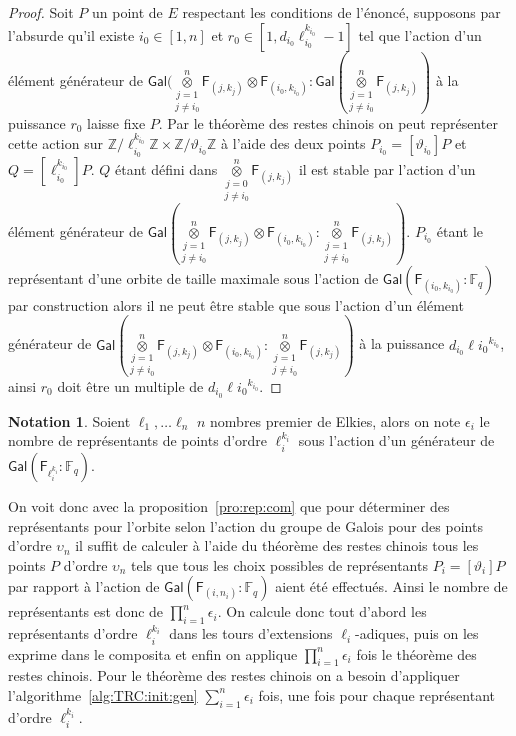 \documentclass[10pt,a4paper]{book}
\theoremstyle{plain}
\theoremstyle{definition}
\theoremstyle{definition}
\theoremstyle{definition}
\theoremstyle{definition}
\theoremstyle{remark}
\theoremstyle{remark}
\theoremstyle{definition}
\newtheorem{nota}[thm]{Notation}
\begin{document}
\begin{proof}
Soit $P$ un point de $E$ respectant les conditions de l'énoncé, supposons par 
l'absurde qu'il existe $i_0 \in [1,n]$ et $r_0 \in [1,d_{i_0}\ell_{i_0}^{k_{i_0}}-1]$ 
tel que l'action d'un élément générateur de 
$\mathsf{Gal}(\overset{n}{\underset{j \neq i_0}{\underset{j = 1}{\otimes}}}\mathsf{F}_{(j,k_j)}\otimes \mathsf{F}_{(i_0,k_{i_0})}:\mathsf{Gal}(\overset{n}{\underset{j \neq i_0}{\underset{j = 1}{\otimes}}}\mathsf{F}_{(j,k_j)})$ 
à la puissance $r_0$ laisse fixe $P$. Par le théorème des restes chinois on 
peut représenter cette action sur $\mathbb{Z}/\ell_{i_0}^{k_{i_0}}\mathbb{Z} 
\times \mathbb{Z}/\vartheta_{i_0}\mathbb{Z}$
à l'aide des deux points $P_{i_0}=[\vartheta_{i_0}]P$  et 
$Q=[\ell_{i_0}^{k_{i_0}}]P$. $Q$ étant défini dans 
$\overset{n}{\underset{j \neq i_0}{\underset{j = 0}{\otimes}}} \mathsf{F}_{(j,k_j)}$ 
il est stable par l'action d'un élément générateur de 
$\mathsf{Gal}(\overset{n}{\underset{j \neq i_0}{\underset{j = 1}{\otimes}}}\mathsf{F}_{(j,k_j)}\otimes \mathsf{F}_{(i_0,k_{i_0})}:\overset{n}{\underset{j \neq i_0}{\underset{j = 1}{\otimes}}}\mathsf{F}_{(j,k_j)})$.
$P_{i_0}$ étant le représentant d'une orbite de taille maximale
sous l'action de $\mathsf{Gal}(\mathsf{F}_{(i_0,k_{i_0})}:\mathbb{F}_q)$ par 
construction alors il ne peut être stable que sous l'action d'un élément 
générateur de 
$\mathsf{Gal}(\overset{n}{\underset{j \neq i_0}{\underset{j = 1}{\otimes}}}\mathsf{F}_{(j,k_j)}\otimes \mathsf{F}_{(i_0,k_{i_0})}:\overset{n}{\underset{j \neq i_0}{\underset{j = 1}{\otimes}}}\mathsf{F}_{(j,k_j)})$
à la puissance $d_{i_0}\ell{i_0}^{k_{i_0}}$, ainsi $r_0$ doit être un multiple 
de $d_{i_0}\ell{i_0}^{k_{i_0}}$.
\end{proof}

\begin{nota}
Soient $\ell_1, \dots \ell_n$ $n$ nombres premier de Elkies, alors on note 
$\epsilon_i$ le nombre de représentants de points d'ordre $\ell_i^{k_i}$ sous 
l'action d'un générateur de $\mathsf{Gal}(\mathsf{F}_{\ell_i^{k_i}}:\mathbb{F}_q)$.
\end{nota}

On voit donc avec la proposition~\ref{pro:rep:com} que pour déterminer des 
représentants pour l'orbite selon l'action du groupe de Galois pour des points 
d'ordre $\upsilon_n$ il suffit de calculer à l'aide du théorème des 
restes chinois tous les points $P$ d'ordre $\upsilon_n$ 
tels que tous les choix possibles de représentants $P_i=[\vartheta_i]P$
par rapport à l'action de $\mathsf{Gal}(\mathsf{F}_{(i,n_i)}:\mathbb{F}_q)$
 aient été effectués. Ainsi le nombre de représentants est
 donc de $\prod_{i=1}^{n} \epsilon_i$. On calcule donc 
 tout d'abord les représentants d'ordre $\ell_i^{k_i}$ dans les tours 
 d'extensions $\ell_i$-adiques, puis on les exprime dans le composita et enfin
 on applique $\prod_{i=1}^{n} \epsilon_i$ fois le théorème des restes chinois. 
 Pour le théorème des restes chinois on a besoin d'appliquer 
 l'algorithme~\ref{alg:TRC:init:gen} $\sum_{i=1}^{n} \epsilon_i$ fois, une fois
 pour chaque représentant d'ordre $\ell_i^{k_i}$.
  
\end{document}
